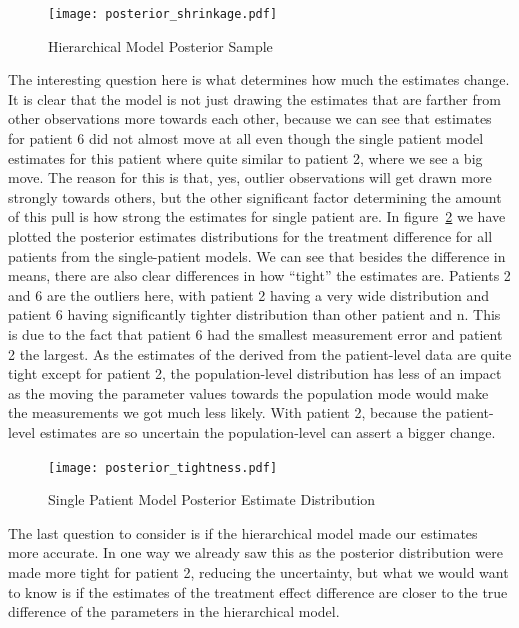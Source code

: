 \documentclass[12pt,a4paper,leqno]{report}
\theoremstyle{plain}
\theoremstyle{definition}
\theoremstyle{remark}
\begin{document}
\bigskip
\begin{figure}[H]
    \caption{Hierarchical Model Posterior Sample}\label{posteriorshrinkage}
    \bigskip
    \centering
    \texttt{[image: posterior\_shrinkage.pdf]}
\end{figure}
\bigskip

The interesting question here is what determines how much the
estimates change. It is clear that the model is not just drawing the estimates that are
farther from other observations
more towards each other, because we can see that estimates for patient 6 did not almost
move at all even though the single patient model estimates for this patient where quite
similar to patient 2, where we see a big move. The reason for this is that, yes, outlier
observations will get drawn more strongly towards others, but the other significant
factor determining the amount of this pull is how strong the estimates for single
patient are. In figure\ \ref{modeltightness} we have plotted the posterior estimates
distributions for the treatment difference for all patients from the single-patient
models. We can see that besides the
difference in means, there are also clear differences in how ``tight'' the estimates
are. Patients 2 and 6 are the outliers here, with patient 2 having a very wide
distribution and patient 6 having significantly tighter
distribution than other patient and n. This
is due to the fact that patient 6 had the smallest measurement error and patient 2 the
largest. As the estimates of the derived from the patient-level data are quite tight
except for patient 2, the population-level distribution has less of an impact as the
moving the parameter values towards the population mode would make the measurements we
got much less likely. With patient 2, because the patient-level estimates are so
uncertain the population-level can assert a bigger change.

\bigskip
\begin{figure}[H]
    \caption{Single Patient Model Posterior Estimate Distribution}\label{modeltightness}
    \bigskip
    \texttt{[image: posterior\_tightness.pdf]}
\end{figure}
\bigskip

The last question to consider is if the hierarchical model made our estimates more
accurate. In one way we already saw this as the posterior distribution were made more
tight for patient 2, reducing the uncertainty, but what we would want to know is if the
estimates of the treatment effect difference are closer to the true difference of the
parameters in the hierarchical model.
\end{document}
